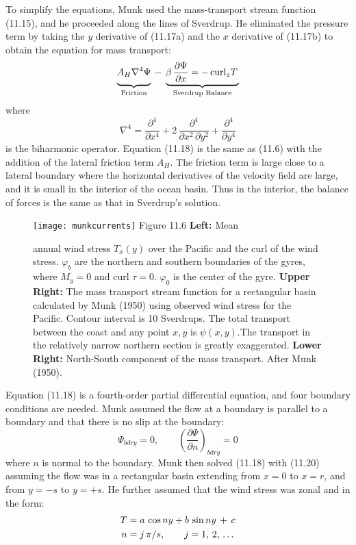 To simplify the equations, Munk used the mass-transport stream
function (11.15), and he proceeded
along the lines of Sverdrup. He eliminated the pressure term by taking
the $y$ derivative of (11.17a) and the $x$ derivative of (11.17b) to
obtain the equation for mass transport:
\begin{equation}
\underbrace{A_H \nabla^{4}
\Psi\vphantom{\frac{\partial\Psi}{\partial{x}}}}_{\text{Friction}}\:-\:\underbrace{\beta\,\frac{\partial\Psi}{\partial{x}} =-\,\text{curl}_z T
\,}_{\text{Sverdrup Balance}}
\end{equation}
where
\begin{equation}
\nabla^4 =\frac{\partial^4}{\partial{x}^4}+2\,\frac{\partial^4}{\partial{x}^2
\,\partial{y}^2} + \frac{\partial^4}{\partial{y}^4}
\end{equation}
is the biharmonic operator. Equation (11.18) is the same as (11.6)
with the addition of the lateral friction term $A_H$. The friction
term is large close to a lateral boundary where the horizontal
derivatives of the velocity field are large, and it is small in the
interior of the ocean basin. Thus in the interior, the balance of
forces is the same as that in Sverdrup's solution.

\begin{figure}[t!]
\texttt{[image: munkcurrents]}
\footnotesize
Figure 11.6 \textbf{Left:} Mean \rule{0mm}{4ex}annual wind
stress $T_x (y)$ over the Pacific
and the curl of the wind stress. $\varphi _b$ are the northern and
southern boundaries of the gyres, where $M_y = 0$ and curl $\tau = 0$.
$\varphi _0$ is the center of the gyre.  \textbf{Upper Right:} The
mass transport stream function for a
rectangular basin calculated by Munk (1950) using observed wind stress
for the Pacific. Contour interval is 10 Sverdrups. The total transport
between the coast and any point $x,y$ is $\psi (x,y)$.The transport in
the relatively narrow northern section is greatly exaggerated.
\textbf{Lower Right:} North-South component of the mass
transport. After Munk (1950).
\label{fig:munkcurrents}
\vspace{-3ex}
\end{figure}

Equation (11.18) is a fourth-order partial differential equation, and
four boundary conditions are needed. Munk assumed the flow at a
boundary is parallel to a boundary and that there is no slip at the
boundary:
\begin{equation}
\Psi_{bdry} = 0, \qquad \left(\frac{\partial{\Psi}}{\partial{n}}\right)_{bdry} = 0
\end{equation}
where $n$ is normal to the boundary. Munk then solved (11.18) with
(11.20) assuming the flow was in a rectangular basin extending from $x
= 0$ to $x = r$, and from $y = -s$ to $y = +s$. He further assumed
that the wind stress was zonal and in the form:
\begin{align}
T&=a\,\cos ny + b\,\sin ny \,+\, c  \notag \\
n&=j\,\pi/s, \qquad j=1,\,2,\,\dots
\end{align}

